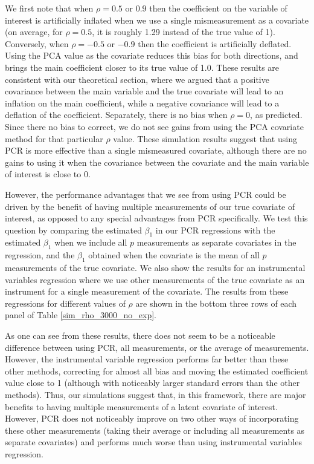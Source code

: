 \documentclass[10pt]{article}
\begin{document}
        We first note that when $\rho = 0.5$ or $0.9$ then the coefficient on the variable of interest is artificially inflated when we use a single mismeasurement as a covariate (on average, for $\rho = 0.5$, it is roughly 1.29 instead of the true value of 1). Conversely, when $\rho = -0.5$ or $-0.9$ then the coefficient is artificially deflated. Using the PCA value as the covariate reduces this bias for both directions, and brings the main coefficient closer to its true value of 1.0. These results are consistent with our theoretical section, where we argued that a positive covariance between the main variable and the true covariate will lead to an inflation on the main coefficient, while a negative covariance will lead to a deflation of the coefficient. Separately, there is no bias when $\rho = 0$, as predicted. Since there no bias to correct, we do not see gains from using the PCA covariate method for that particular $\rho$ value. These simulation results suggest that using PCR is more effective than a single mismeasured covariate, although there are no gains to using it when the covariance between the covariate and the main variable of interest is close to $0$. 

        However, the performance advantages that we see from using PCR could be driven by the benefit of having multiple measurements of our true covariate of interest, as opposed to any special advantages from PCR specifically. We test this question by comparing the estimated $\beta_1$ in our PCR regressions with the estimated $\beta_1$ when we include all $p$ measurements as separate covariates in the regression, and the $\beta_1$ obtained when the covariate is the mean of all $p$ measurements of the true covariate. We also show the results for an instrumental variables regression where we use other measurements of the true covariate as an instrument for a single measurement of the covariate. The results from these regressions for different values of $\rho$ are shown in the bottom three rows of each panel of Table \ref{sim_rho_3000_no_exp}.

        As one can see from these results, there does not seem to be a noticeable difference between using PCR, all measurements, or the average of measurements. However, the instrumental variable regression performs far better than these other methods, correcting for almost all bias and moving the estimated coefficient value close to 1 (although with noticeably larger standard errors than the other methods). Thus, our simulations suggest that, in this framework, there are major benefits to having multiple measurements of a latent covariate of interest. However, PCR does not noticeably improve on two other ways of incorporating these other measurements (taking their average or including all measurements as separate covariates) and performs much worse than using instrumental variables regression.
\end{document}
